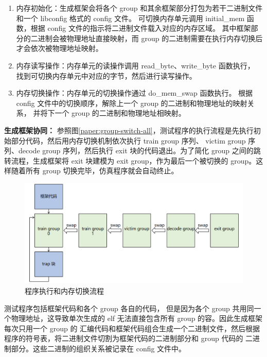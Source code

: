 \begin{enumerate}
    \item 内存初始化：生成框架会将各个 group 和其余框架部分打包为若干二进制文件和一个 libconfig 格式的 config 文件。
可切换内存单元调用 initial\_mem 函数，根据 config 文件的指示将二进制文件载入对应的内存区域。
其中框架部分的二进制会被物理地址直接映射，而 group 的二进制需要在执行内存切换后才会依次被物理地址映射。\par
    \item 内存读写操作：内存单元的读操作调用 read\_byte、write\_byte 函数执行，
找到可切换内存单元中对应的字节，然后进行读写操作。\par
    \item 内存切换操作：内存单元的切换操作通过 do\_mem\_swap 函数执行。
根据 config 文件中的切换顺序，解除上一个 group 的二进制和物理地址的映射关系，
并将下一个 group 的二进制和物理地址相映射。\par
\end{enumerate}

\textbf{生成框架协同：}
参照图\ref{paper:group-switch-all}，测试程序的执行流程是先执行初始部分代码，然后用内存切换机制依次执行 train group 序列、
victim group 序列、decode group 序列，然后执行 exit 块的代码退出。为了简化 group 之间的跳转流程，生成框架将 exit 块建模为
 exit group，作为最后一个被切换的 group。这样随着所有 group 切换完毕，仿真程序就会自动终止。\par

 \begin{figure}[!h]
    \centering
    \includegraphics[width=\linewidth]{figure/paper/execute-flow.png}
    \caption{程序执行和内存切换流程}
    \label{paper:execute-flow}
\end{figure}

测试程序包括框架代码和各个 group 各自的代码，
但是因为各个 group 共用同一个物理地址，这导致单次生成的 elf 无法直接包含所有 group 的容。因此生成框架每次只用一个 group 的
汇编代码和框架代码组合生成一个二进制文件，然后根据程序的符号表，将二进制文件切割为框架代码的二进制部分和 group 代码的
二进制部分。这些二进制的组织关系被记录在 config 文件中。\par

